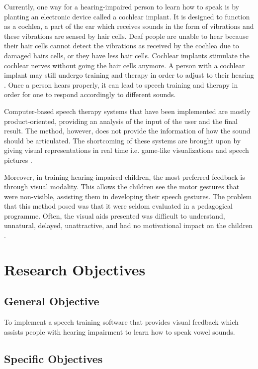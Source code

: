 Currently, one way for a hearing-impaired person to learn how to speak is by planting an electronic device called a cochlear implant. It is designed to function as a cochlea, a part of the ear which receives sounds in the form of vibrations and these vibrations are sensed by hair cells. Deaf people are unable to hear because their hair cells cannot detect the vibrations as received by the cochlea due to damaged hairs cells, or they have less hair cells. Cochlear implants stimulate the cochlear nerves without going the hair cells anymore. A person with a cochlear implant may still undergo training and therapy in order to adjust to their hearing \cite{blume:2009:AE}. Once a person hears properly, it can lead to speech training and therapy in order for one to respond accordingly to different sounds.
					
Computer-based speech therapy systems that have been implemented are mostly product-oriented, providing an analysis of the input of the user and the final result. The method, however, does not provide the information of how the sound should be articulated. The shortcoming of these systems are brought upon by giving visual representations in real time i.e. game-like visualizations and speech pictures \cite{oster:2006:cbs}.
									
Moreover, in training hearing-impaired children, the most preferred feedback is through visual modality. This allows the children see the motor gestures that were non-visible, assisting them in developing their speech gestures. The problem that this method posed was that it were seldom evaluated in a pedagogical programme. Often, the visual aids presented was difficult to understand, unnatural, delayed, unattractive, and had no motivational impact on the children \cite{oster:2006:cbs}.
				
\section{Research Objectives}
\label{sec:researchobjectives}

\subsection{General Objective}
\label{sec:generalobjective}

To implement a speech training software that provides visual feedback which assists people with hearing impairment to learn how to speak vowel sounds.

\subsection{Specific Objectives}
\label{sec:specificobjectives}

